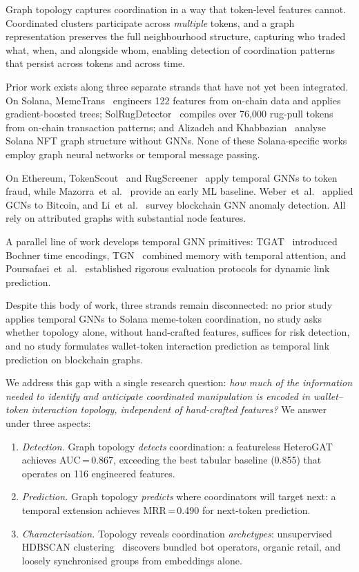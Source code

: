 \documentclass[10pt,journal]{IEEEtran}
\begin{document}
Graph topology captures coordination in a way that token-level
features cannot. Coordinated clusters participate across
\emph{multiple} tokens, and a graph representation preserves the full
neighbourhood structure, capturing who traded what, when, and alongside
whom, enabling detection of coordination patterns that persist across
tokens and across time.

Prior work exists along three separate strands that have not yet been
integrated. On Solana, MemeTrans~\cite{hu2026memetrans} engineers 122
features from on-chain data and applies gradient-boosted trees;
SolRugDetector~\cite{chen2026solrugdetector} compiles over 76{,}000
rug-pull tokens from on-chain transaction patterns; and
Alizadeh and Khabbazian~\cite{alizadeh2025solana} analyse Solana NFT
graph structure without GNNs. None of these Solana-specific works
employ graph neural networks or temporal message passing.

On Ethereum, TokenScout~\cite{wu2024tokenscout} and
RugScreener~\cite{wu2025rugscreener} apply temporal GNNs to token
fraud, while Mazorra~et~al.~\cite{mazorra2022donotrug} provide an
early ML baseline. Weber~et~al.~\cite{weber2019elliptic} applied GCNs
to Bitcoin, and Li~et~al.~\cite{li2022blockchain_survey} survey
blockchain GNN anomaly detection. All rely on attributed graphs with
substantial node features.

A parallel line of work develops temporal GNN
primitives: TGAT~\cite{xu2020tgat} introduced Bochner time encodings,
TGN~\cite{rossi2020tgn} combined memory with temporal attention, and
Poursafaei~et~al.~\cite{poursafaei2022edgebank} established rigorous
evaluation protocols for dynamic link prediction.

Despite this body of work, three strands remain disconnected: no
prior study applies temporal GNNs to Solana meme-token coordination,
no study asks whether topology alone, without hand-crafted
features, suffices for risk detection, and no study formulates
wallet-token interaction prediction as temporal link prediction on
blockchain graphs.

We address this gap with a single research question: \emph{how much
of the information needed to identify and anticipate coordinated
manipulation is encoded in wallet--token interaction topology,
independent of hand-crafted features?} We answer under three aspects:
\begin{enumerate}[label=(\roman*)]
\item \textit{Detection.} Graph topology \emph{detects} coordination:
  a featureless HeteroGAT achieves AUC\,=\,0.867, exceeding the best
  tabular baseline (0.855) that operates on 116 engineered features.
\item \textit{Prediction.} Graph topology \emph{predicts} where
  coordinators will target next: a temporal extension achieves
  MRR\,=\,0.490 for next-token prediction.
\item \textit{Characterisation.} Topology reveals coordination
  \emph{archetypes}: unsupervised HDBSCAN
  clustering~\cite{mcinnes2017hdbscan} discovers bundled bot
  operators, organic retail, and loosely synchronised groups from
  embeddings alone.
\end{enumerate}
\end{document}
